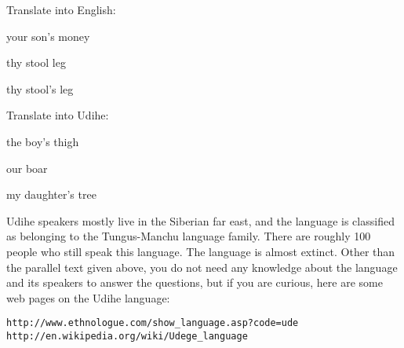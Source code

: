 \documentclass[11pt]{article}
\begin{document}
\begin{exe}

\ex Translate into English:

\begin{xlist}
{\ex {}

\begin{soln}
your son's money
\end{soln}
}

{\ex {}

\begin{soln}
thy stool leg
\end{soln}
}

{\ex 
{}

\begin{soln}
thy stool's leg
\end{soln}
}

\end{xlist}

\ex Translate into Udihe:

\begin{xlist}
{\ex the boy's thigh

\begin{soln}
\end{soln}
}

{\ex our boar

\begin{soln}
\end{soln}
}

{\ex my daughter's tree

\begin{soln}
\end{soln}
}

\end{xlist}

\end{exe}

Udihe speakers mostly live in the Siberian far east, 
and the language is classified as belonging to the Tungus-Manchu language
family. There are roughly 100 people who still speak this language. The language
is almost extinct. Other than the parallel text given above, you do not need any knowledge about the language
and its speakers to answer the questions, but if you are curious, here are
some web pages on the Udihe language:

{\small
\begin{verbatim}
http://www.ethnologue.com/show_language.asp?code=ude
http://en.wikipedia.org/wiki/Udege_language
\end{verbatim}
}
\end{document}
